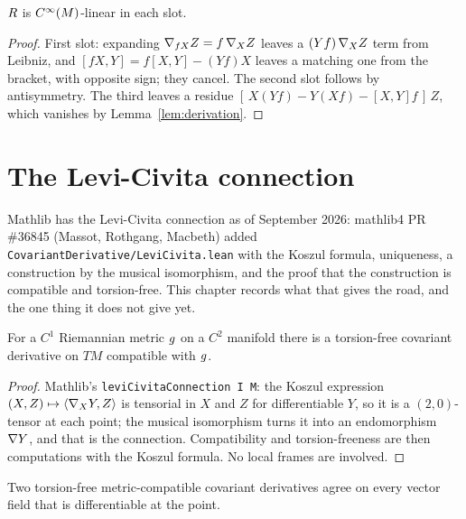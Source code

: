 \begin{lemma}
  \label{lem:tensoriality}
  \leanok
  $R$ is $C^\infty(M)$-linear in each slot.
\end{lemma}

\begin{proof}
  \leanok
  First slot: expanding $\nabla_{fX}Z = f\,\nabla_X Z$ leaves a $(Yf)\,\nabla_X Z$ term
  from Leibniz, and $[fX,Y] = f[X,Y] - (Yf)X$ leaves a matching one from the
  bracket, with opposite sign; they cancel. The second slot follows by
  antisymmetry. The third leaves a residue $[\,X(Yf) - Y(Xf) - [X,Y]f\,]\,Z$,
  which vanishes by Lemma~\ref{lem:derivation}.
\end{proof}

\chapter{The Levi-Civita connection}
\label{chap:levi-civita}

Mathlib has the Levi-Civita connection as of September 2026: mathlib4
PR \#36845 (Massot, Rothgang, Macbeth) added
\texttt{CovariantDerivative/LeviCivita.lean} with the Koszul formula,
uniqueness, a construction by the musical isomorphism, and the proof that the
construction is compatible and torsion-free. This chapter records what that
gives the road, and the one thing it does not give yet.

\begin{theorem}[Existence]
  \label{thm:levi-civita}
  \leanok
  For a $C^1$ Riemannian metric $g$ on a $C^2$ manifold there is a torsion-free
  covariant derivative on $TM$ compatible with $g$.
\end{theorem}

\begin{proof}
  \leanok
  Mathlib's \texttt{leviCivitaConnection I M}: the Koszul expression
  $(X, Z) \mapsto \langle \nabla_X Y, Z\rangle$ is tensorial in $X$ and $Z$ for
  differentiable $Y$, so it is a $(2,0)$-tensor at each point; the musical
  isomorphism turns it into an endomorphism $\nabla Y$, and that is the
  connection. Compatibility and torsion-freeness are then computations with the
  Koszul formula. No local frames are involved.
\end{proof}

\begin{theorem}[Uniqueness]
  \label{thm:levi-civita-unique}
  \leanok
  Two torsion-free metric-compatible covariant derivatives agree on every vector
  field that is differentiable at the point.
\end{theorem}

